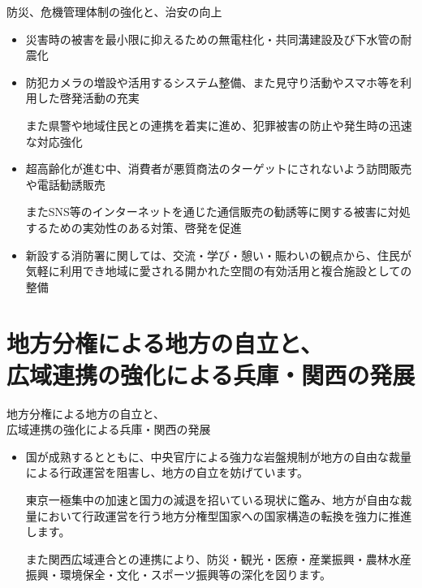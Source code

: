 \documentclass[dvipdfmx]{beamer}
\begin{document}
    \begin{frame}{防災、危機管理体制の強化と、治安の向上}{}
        \begin{small}
            \begin{itemize}
                \setlength{\parsep}{.5mm}
                \setlength{\itemsep}{2mm}
                \item 災害時の被害を最小限に抑えるための無電柱化・共同溝建設及び下水管の耐震化
                \item 防犯カメラの増設や活用するシステム整備、また見守り活動やスマホ等を利用した啓発活動の充実\par
                また県警や地域住民との連携を着実に進め、犯罪被害の防止や発生時の迅速な対応強化
                \item 超高齢化が進む中、消費者が悪質商法のターゲットにされないよう訪問販売や電話勧誘販売\par
                またSNS等のインターネットを通じた通信販売の勧誘等に関する被害に対処するための実効性のある対策、啓発を促進
                \item 新設する消防署に関しては、交流・学び・憩い・賑わいの観点から、住民が気軽に利用でき地域に愛される開かれた空間の有効活用と複合施設としての整備
            \end{itemize}
        \end{small}
    \end{frame}

\section{地方分権による地方の自立と、\\広域連携の強化による兵庫・関西の発展}
    \begin{frame}{}{}
        \sectionpage
    \end{frame}

    \begin{frame}{地方分権による地方の自立と、\\広域連携の強化による兵庫・関西の発展}{}
        \begin{small}
            \begin{itemize}
                \setlength{\parsep}{.5mm}
                \setlength{\itemsep}{2mm}
                \item 国が成熟するとともに、中央官庁による強力な岩盤規制が地方の自由な裁量による行政運営を阻害し、地方の自立を妨げています。\par
                東京一極集中の加速と国力の減退を招いている現状に鑑み、地方が自由な裁量において行政運営を行う地方分権型国家への国家構造の転換を強力に推進します。\par
                また関西広域連合との連携により、防災・観光・医療・産業振興・農林水産振興・環境保全・文化・スポーツ振興等の深化を図ります。
            \end{itemize}
        \end{small}
    \end{frame}
\end{document}
